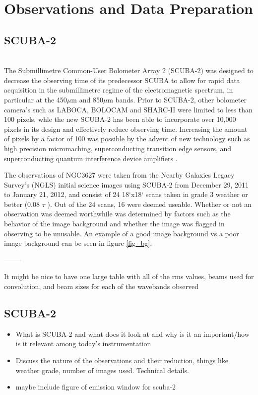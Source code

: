 \chapter{Observations and Data Preparation}\label{observations}

\section{SCUBA-2} \\
The Submillimetre Common-User Bolometer Array 2 (SCUBA-2) was designed to decrease the observing time of its predecessor SCUBA to allow for rapid data acquisition in the submillimetre regime of the electromagnetic spectrum, in particular at the 450$\mu$m and 850$\mu$m bands.  Prior to SCUBA-2, other bolometer camera's such as LABOCA, BOLOCAM and SHARC-II were limited to less than 100 pixels, whle the new SCUBA-2 has been able to incorporate over 10,000 pixels in its design and effectively reduce observing time.  Increasing the amount of pixels by a factor of 100 was possible by the advent of new technology such as high precision micromaching, superconducting transition edge sensors, and superconducting quantum interference device amplifiers \citet{holland2013}.

The observations of NGC3627 were taken from the Nearby Galaxies Legacy Survey's (NGLS) initial science images using SCUBA-2 from December 29, 2011  to January 21, 2012, and consist of 24 18`x18` scans taken in grade 3 weather or better (0.08 \< $\tau$ ).  Out of the 24 scans, 16 were deemed useable.  Whether or not an observation was deemed worthwhile was determined by factors such as the behavior of the image background and whether the image was flagged in observing to be unusable.  An example of a good image background vs a poor image background can be seen in figure \ref{fig_bg}.  



--------

It might be nice to have one large table with all of the rms values, beams used for convolution, and beam sizes for each of the wavebands observed

\section{SCUBA-2}
\begin{itemize}
   \item What is SCUBA-2 and what does it look at and why is it an important/how is it relevant among today's instrumentation
   \item Discuss the nature of the observations and their reduction, things like weather grade, number of images used.  Technical details.
   \item maybe include figure of emission window for scuba-2
\end{itemize}

